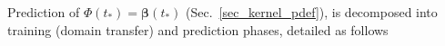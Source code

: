 









Prediction of ${\Phi (t_*)}  = \boldsymbol{\beta}(t_*)$ (Sec.~\ref{sec_kernel_pdef}), is decomposed into training (domain transfer) and prediction phases, detailed as follows
